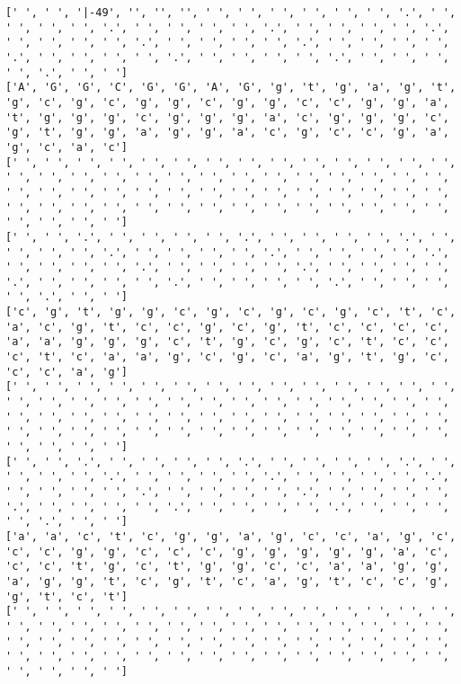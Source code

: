 \documentclass{article}
\begin{document}
\begin{Verbatim}
[' ', ' ', '|-49', '', '', '', ' ', ' ', ' ', ' ', ' ', ' ', '.', ' ', ' ', ' ', ' ', '.', ' ', ' ', ' ', ' ', '.', ' ', ' ', ' ', ' ', '.', ' ', ' ', ' ', ' ', '.', ' ', ' ', ' ', ' ', '.', ' ', ' ', ' ', ' ', '.', ' ', ' ', ' ', ' ', '.', ' ', ' ', ' ', ' ', '.', ' ', ' ', ' ', ' ', '.', ' ', ' ']
['A', 'G', 'G', 'C', 'G', 'G', 'A', 'G', 'g', 't', 'g', 'a', 'g', 't', 'g', 'c', 'g', 'c', 'g', 'g', 'c', 'g', 'g', 'c', 'c', 'g', 'g', 'a', 't', 'g', 'g', 'g', 'c', 'g', 'g', 'g', 'a', 'c', 'g', 'g', 'g', 'c', 'g', 't', 'g', 'g', 'a', 'g', 'g', 'a', 'c', 'g', 'c', 'c', 'g', 'a', 'g', 'c', 'a', 'c']
[' ', ' ', ' ', ' ', ' ', ' ', ' ', ' ', ' ', ' ', ' ', ' ', ' ', ' ', ' ', ' ', ' ', ' ', ' ', ' ', ' ', ' ', ' ', ' ', ' ', ' ', ' ', ' ', ' ', ' ', ' ', ' ', ' ', ' ', ' ', ' ', ' ', ' ', ' ', ' ', ' ', ' ', ' ', ' ', ' ', ' ', ' ', ' ', ' ', ' ', ' ', ' ', ' ', ' ', ' ', ' ', ' ', ' ', ' ', ' ']
[' ', ' ', '.', ' ', ' ', ' ', ' ', '.', ' ', ' ', ' ', ' ', '.', ' ', ' ', ' ', ' ', '.', ' ', ' ', ' ', ' ', '.', ' ', ' ', ' ', ' ', '.', ' ', ' ', ' ', ' ', '.', ' ', ' ', ' ', ' ', '.', ' ', ' ', ' ', ' ', '.', ' ', ' ', ' ', ' ', '.', ' ', ' ', ' ', ' ', '.', ' ', ' ', ' ', ' ', '.', ' ', ' ']
['c', 'g', 't', 'g', 'g', 'c', 'g', 'c', 'g', 'c', 'g', 'c', 't', 'c', 'a', 'c', 'g', 't', 'c', 'c', 'g', 'c', 'g', 't', 'c', 'c', 'c', 'c', 'a', 'a', 'g', 'g', 'g', 'c', 't', 'g', 'c', 'g', 'c', 't', 'c', 'c', 'c', 't', 'c', 'a', 'a', 'g', 'c', 'g', 'c', 'a', 'g', 't', 'g', 'c', 'c', 'c', 'a', 'g']
[' ', ' ', ' ', ' ', ' ', ' ', ' ', ' ', ' ', ' ', ' ', ' ', ' ', ' ', ' ', ' ', ' ', ' ', ' ', ' ', ' ', ' ', ' ', ' ', ' ', ' ', ' ', ' ', ' ', ' ', ' ', ' ', ' ', ' ', ' ', ' ', ' ', ' ', ' ', ' ', ' ', ' ', ' ', ' ', ' ', ' ', ' ', ' ', ' ', ' ', ' ', ' ', ' ', ' ', ' ', ' ', ' ', ' ', ' ', ' ']
[' ', ' ', '.', ' ', ' ', ' ', ' ', '.', ' ', ' ', ' ', ' ', '.', ' ', ' ', ' ', ' ', '.', ' ', ' ', ' ', ' ', '.', ' ', ' ', ' ', ' ', '.', ' ', ' ', ' ', ' ', '.', ' ', ' ', ' ', ' ', '.', ' ', ' ', ' ', ' ', '.', ' ', ' ', ' ', ' ', '.', ' ', ' ', ' ', ' ', '.', ' ', ' ', ' ', ' ', '.', ' ', ' ']
['a', 'a', 'c', 't', 'c', 'g', 'g', 'a', 'g', 'c', 'c', 'a', 'g', 'c', 'c', 'c', 'g', 'g', 'c', 'c', 'c', 'g', 'g', 'g', 'g', 'g', 'a', 'c', 'c', 'c', 't', 'g', 'c', 't', 'g', 'g', 'c', 'c', 'a', 'a', 'g', 'g', 'a', 'g', 'g', 't', 'c', 'g', 't', 'c', 'a', 'g', 't', 'c', 'c', 'g', 'g', 't', 'c', 't']
[' ', ' ', ' ', ' ', ' ', ' ', ' ', ' ', ' ', ' ', ' ', ' ', ' ', ' ', ' ', ' ', ' ', ' ', ' ', ' ', ' ', ' ', ' ', ' ', ' ', ' ', ' ', ' ', ' ', ' ', ' ', ' ', ' ', ' ', ' ', ' ', ' ', ' ', ' ', ' ', ' ', ' ', ' ', ' ', ' ', ' ', ' ', ' ', ' ', ' ', ' ', ' ', ' ', ' ', ' ', ' ', ' ', ' ', ' ', ' ']

\end{Verbatim}
\end{document}
